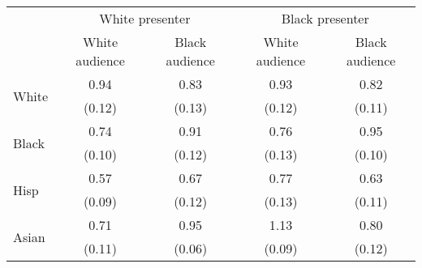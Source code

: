 \def\sym#1{\ifmmode^{#1}\else\(^{#1}\)\fi}
\begin{tabular}{l || c|c||c|c} 
 &\multicolumn{2}{c}{White presenter}                                 &\multicolumn{2}{c}{Black presenter}                          \\\cmidrule(lr){2-3}\cmidrule(lr){4-5}
& {White audience} & {Black audience} & {White  audience} & {Black  audience}\\
\toprule
\midrule
\multirow{2}{*}{White} & 0.94 & 0.83 & 0.93 & 0.82 \\
& (0.12) & (0.13) & (0.12) & (0.11) \\
\hline
\multirow{2}{*}{Black} & 0.74 & 0.91 & 0.76 & 0.95 \\
& (0.10) & (0.12) & (0.13) & (0.10) \\
\hline
\multirow{2}{*}{Hisp} & 0.57 & 0.67 & 0.77 & 0.63 \\
& (0.09) & (0.12) & (0.13) & (0.11) \\
\hline
\multirow{2}{*}{Asian} & 0.71 & 0.95 & 1.13 & 0.80 \\
& (0.11) & (0.06) & (0.09) & (0.12) \\
\hline
\bottomrule
\end{tabular}
